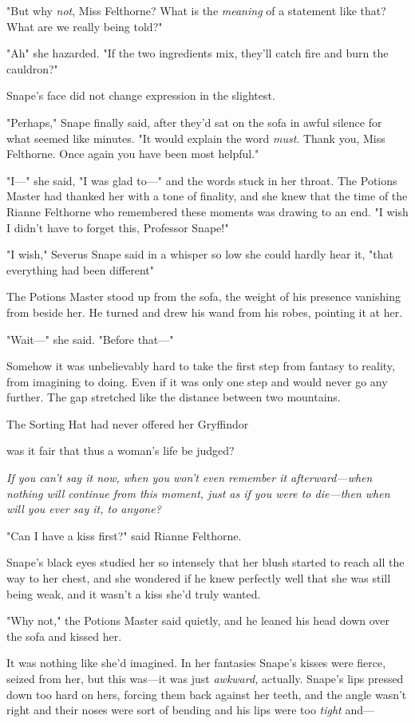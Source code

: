 "But why \emph{not}, Miss Felthorne? What is the \emph{meaning} of a statement
like that? What are we really being told?"

"Ah{\el}" she hazarded. "If the two ingredients mix, they'll catch fire and
burn the cauldron?"

Snape's face did not change expression in the slightest.

"Perhaps," Snape finally said, after they'd sat on the sofa in awful silence
for what seemed like minutes. "It would explain the word \emph{must}. Thank
you, Miss Felthorne. Once again you have been most helpful."

"I—" she said, "I was glad to—" and the words stuck in her throat. The
Potions Master had thanked her with a tone of finality, and she knew that the
time of the Rianne Felthorne who remembered these moments was drawing to an
end. "I wish I didn't have to forget this, Professor Snape!"

"I wish," Severus Snape said in a whisper so low she could hardly hear it,
"that everything had been different{\el}"

The Potions Master stood up from the sofa, the weight of his presence vanishing
from beside her. He turned and drew his wand from his robes, pointing it at her.

"Wait—" she said. "Before that—"

Somehow it was unbelievably hard to take the first step from fantasy to
reality, from imagining to doing. Even if it was only one step and would never
go any further. The gap stretched like the distance between two mountains.

The Sorting Hat had never offered her Gryffindor{\el}

{\el} was it fair that thus a woman's life be judged?

\emph{If you can't say it now, when you won't even remember it afterward—when
nothing will continue from this moment, just as if you were to die—then when
will you ever say it, to anyone?}

"Can I have a kiss first?" said Rianne Felthorne.

Snape's black eyes studied her so intensely that her blush started to reach all
the way to her chest, and she wondered if he knew perfectly well that she was
still being weak, and it wasn't a kiss she'd truly wanted.

"Why not," the Potions Master said quietly, and he leaned his head down over
the sofa and kissed her.

It was nothing like she'd imagined. In her fantasies Snape's kisses were
fierce, seized from her, but this was—it was just \emph{awkward,} actually.
Snape's lips pressed down too hard on hers, forcing them back against her
teeth, and the angle wasn't right and their noses were sort of bending and his
lips were too \emph{tight} and—

